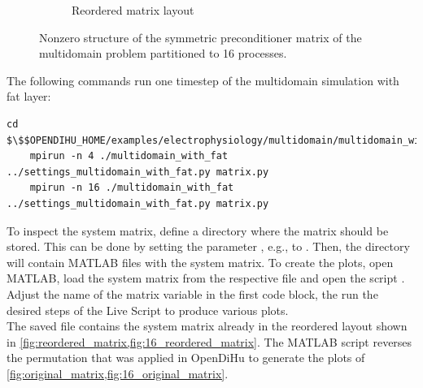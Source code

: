 \begin{figure}
\begin{subfigure}[t]{0.49\textwidth}
    \caption{Reordered matrix layout}%
    \label{fig:16_reordered_diagonal_matrix}%
  \end{subfigure}
  \caption{Nonzero structure of the symmetric preconditioner matrix of the multidomain problem partitioned to 16 processes.}%
  \label{fig:16_original_reordered_diagonal_matrix}%
\end{figure}%

\begin{reproduce_no_break}
  The following commands run one timestep of the multidomain simulation with fat layer:
  \begin{lstlisting}[columns=fullflexible,breaklines=true,postbreak=\mbox{\textcolor{gray}{$\hookrightarrow$}\space}]
    cd $\$$OPENDIHU_HOME/examples/electrophysiology/multidomain/multidomain_with_fat/build_release
    mpirun -n 4 ./multidomain_with_fat ../settings_multidomain_with_fat.py matrix.py
    mpirun -n 16 ./multidomain_with_fat ../settings_multidomain_with_fat.py matrix.py
  \end{lstlisting}
  To inspect the system matrix, define a directory where the matrix should be stored. This can be done by setting the parameter \code{config[`Solvers`][`multidomainLinear}\code{Solver`][`dumpFilename`]}, e.g., to . Then, the directory  will contain MATLAB files with the system matrix. To create the plots, open MATLAB, load the system matrix from the  respective file and open the script . Adjust the name of the matrix variable in the first code block, the run the desired steps of the Live Script to produce various plots.\\
  The saved file contains the system matrix already in the reordered layout shown in \cref{fig:reordered_matrix,fig:16_reordered_matrix}. The MATLAB script reverses the permutation that was applied in OpenDiHu to generate the plots of \cref{fig:original_matrix,fig:16_original_matrix}.
\end{reproduce_no_break}

% 

